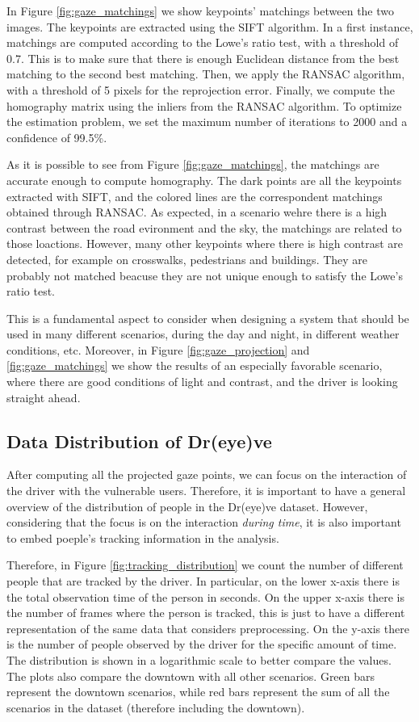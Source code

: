 In Figure \ref{fig:gaze_matchings} we show keypoints' matchings between the 
two images. The keypoints are extracted using the SIFT algorithm.
In a first instance, matchings are computed according to the Lowe's ratio test, 
with a threshold of 0.7. This is to make sure that there is enough Euclidean 
distance from the best matching to the second best matching. Then, we apply 
the RANSAC algorithm, with a threshold of 5 pixels for the reprojection error.
Finally, we compute the homography matrix using the inliers from the RANSAC 
algorithm. To optimize the estimation problem, we set the maximum number of 
iterations to 2000 and a confidence of 99.5\%.

As it is possible to see from Figure \ref{fig:gaze_matchings}, the matchings 
are accurate enough to compute homography. The dark points are all the keypoints 
extracted with SIFT, and the colored lines are the correspondent matchings 
obtained through RANSAC. 
As expected, in a scenario wehre there is a high contrast between the road 
evironment and the sky, the matchings are related to those loactions. 
However, many other keypoints where there is high contrast are detected, for 
example on crosswalks, pedestrians and buildings. They are probably not matched 
beacuse they are not unique enough to satisfy the Lowe's ratio test.

This is a fundamental aspect to consider when designing a system that should be 
used in many different scenarios, during the day and night, in different weather 
conditions, etc. Moreover, in Figure \ref{fig:gaze_projection} and 
\ref{fig:gaze_matchings} we show the results of an especially favorable scenario, 
where there are good conditions of light and contrast, and the driver is looking 
straight ahead.

\subsection{Data Distribution of Dr(eye)ve}
After computing all the projected gaze points, we can focus on the interaction 
of the driver with the vulnerable users. Therefore, it is important to have 
a general overview of the distribution of people in the Dr(eye)ve dataset.
However, considering that the focus is on the interaction \emph{during time},
it is also important to embed poeple's tracking information in the analysis.

Therefore, in Figure \ref{fig:tracking_distribution} we count the number of 
different people that are tracked by the driver. In particular, on the lower 
x-axis there is the total observation time of the person in seconds. On the 
upper x-axis there is the number of frames where the person is tracked, this is 
just to have a different representation of the same data that considers 
preprocessing. On the y-axis there is the number of people observed by the driver 
for the specific amount of time. The distribution is shown in a logarithmic scale 
to better compare the values.
The plots also compare the downtown with all other scenarios. Green bars 
represent the downtown scenarios, while red bars represent the sum of all 
the scenarios in the dataset (therefore including the downtown).

